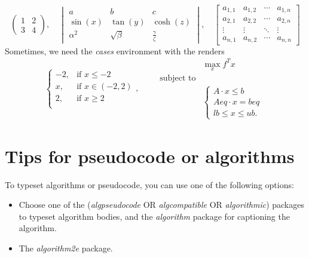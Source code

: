 \documentclass[12pt]{article}  %
\begin{document}
 \begin{equation*}
     \begin{pmatrix}
         1 & 2 \\
         3 & 4
     \end{pmatrix},\quad
     \begin{vmatrix}
     a & b & c  \\
     \sin(x) & \tan(y) & \cosh(z)\\
     \alpha^2 & \sqrt{\beta} & \frac{\gamma}{\zeta}
 \end{vmatrix}, \quad  \begin{bmatrix}
 a_{1,1} & a_{1,2} & \cdots & a_{1,n} \\
 a_{2,1} & a_{2,2} & \cdots & a_{2,n} \\
 \vdots  & \vdots  & \ddots & \vdots  \\
 a_{n,1} & a_{n,2} & \cdots & a_{n,n} 
 \end{bmatrix}	
 \end{equation*}	
 Sometimes, we need the \textit{cases} environment with the renders
 \begin{equation*}		
     \begin{cases}
     -2, & \text{if~} x\le-2 \\
     x, & \text{if~}  x\in(-2,2) \\
     2,  & \text{if~}  x\ge2 \\
     \end{cases},\qquad  
     \begin{aligned}
     &\max_{x} f^Tx  \\
     \text{subject to} & \\
     &\begin{cases}
         A \cdot x \le b\\
         Aeq\cdot x = beq \\
     lb\le x \le ub.
     \end{cases}
     \end{aligned}
 \end{equation*}
 
 \section{Tips for pseudocode or algorithms}
 
 To typeset algorithms or pseudocode, you can use one of the following options:
 
 \begin{itemize}
     \setlength{\parsep}{0ex} %
     \setlength{\topsep}{2ex} %
     \setlength{\itemsep}{1ex} %
     \item Choose one of the (\textit{algpseudocode} OR \textit{algcompatible} OR \textit{algorithmic}) packages to typeset algorithm bodies, and the \textit{algorithm} package for captioning the algorithm.
     \item The \textit{algorithm2e} package.
 \end{itemize}
 
\end{document}

